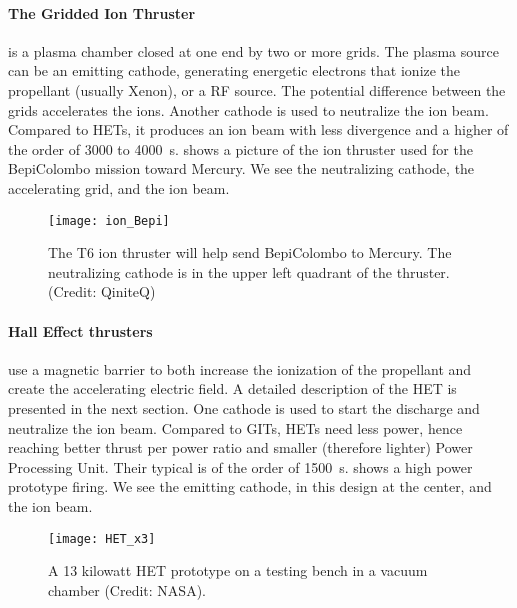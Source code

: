  
 \paragraph{The Gridded Ion Thruster} is a plasma chamber closed at one end by two or more grids.
 The plasma source can be an emitting cathode, generating energetic electrons that ionize the propellant (usually Xenon), or a \ac{RF} source.
 The potential difference between the grids accelerates the ions.
 Another cathode is used to neutralize the ion beam.
 Compared to \ac{HET}s, it produces an ion beam with less divergence and a higher \Isp of the order of 3000 to 4000~s.
  shows a picture of the ion thruster used for the BepiColombo mission toward Mercury.
 We see the neutralizing cathode, the accelerating grid, and the ion beam.
 
\begin{figure}[hbtp]
  \centering
  \texttt{[image: ion\_Bepi]}
  \caption{The T6 ion thruster will help send BepiColombo to Mercury. The neutralizing cathode is in the upper left quadrant of the thruster. (Credit\string: QiniteQ)}
  \label{fig-iongridded}
\end{figure}
 
 \paragraph{Hall Effect thrusters} use a magnetic barrier to both increase the ionization of the propellant and create the accelerating electric field.
 A detailed description of the \ac{HET} is presented in the next section.
 One cathode is used to start the discharge and neutralize the ion beam.
 Compared to GITs, \ac{HET}s need less power, hence reaching better thrust per power ratio and smaller (therefore lighter) Power Processing Unit.
 Their typical \Isp is of the order of 1500~s.
  shows a high power prototype firing.
 We see the emitting cathode, in this design at the center, and the ion beam.
 \begin{figure}[hbtp]
   \centering
   \texttt{[image: HET\_x3]}
   \caption{A 13 kilowatt \ac{HET} prototype on a testing bench in a vacuum chamber (Credit\string: NASA).  }
   \label{fig-13kWHET}
 \end{figure}
 
